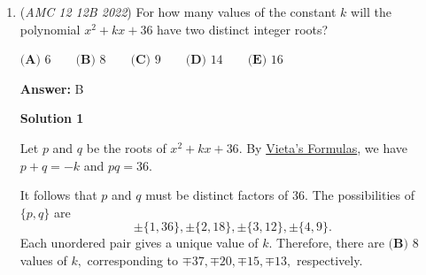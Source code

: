 \begin{enumerate}
 



\textbf{Solution 3 (Simple Sums)}

Observe how 
 \begin{align*} 121 &= 110 + 11, \\ 11211 &= 11100 + 111, \\ 1112111 &= 1111000 + 1111, \\ & \ \vdots \end{align*}
all take the form of 
 \[\underbrace{111\ldots}_{n+1}\underbrace{00\ldots}_{n} + \underbrace{111\ldots}_{n+1} = \underbrace{111\ldots}_{n+1}(10^{n} + 1).\]Factoring each of the sums, we have 
 \[11(10+1), 111(100+1), 1111(1000+1), \ldots\] respectively. With each number factored, there are $\boxed{\textbf{(A) } 0}$ primes in the set.

 



\textbf{Solution 4 (Educated Guess)}

Note that $121$ is divisible by $11$ and $11211$ is divisible by $3$. Because this is Problem 6 of the AMC 10 or Problem 3 on the AMC 12, we assume we do not need to check two-digit prime divisibility or use obscure theorems. Therefore, the answer is $\boxed{\textbf{(A) } 0}.$

 Note: This is an assumption and not a suggested solution. However, it could be useful as a last resort.

 


	\item (\textit{AMC 12 12B 2022}) For how many values of the constant $k$ will the polynomial $x^{2}+kx+36$ have two distinct integer roots?


 $\textbf{(A) }6 \qquad \textbf{(B) }8 \qquad \textbf{(C) }9 \qquad \textbf{(D) }14 \qquad \textbf{(E) }16$

 \textbf{Answer: }B



\textbf{Solution 1}

Let $p$ and $q$ be the roots of $x^{2}+kx+36.$ By \href{https://artofproblemsolving.com/wiki/index.php?title=Vieta\%27s\_Formulas}{Vieta's Formulas}, we have $p+q=-k$ and $pq=36.$

 It follows that $p$ and $q$ must be distinct factors of $36.$ The possibilities of $\{p,q\}$ are 
 \[\pm\{1,36\},\pm\{2,18\},\pm\{3,12\},\pm\{4,9\}.\]Each unordered pair gives a unique value of $k.$ Therefore, there are $\boxed{\textbf{(B) }8}$ values of $k,$ corresponding to $\mp37,\mp20,\mp15,\mp13,$ respectively.


\end{enumerate}
